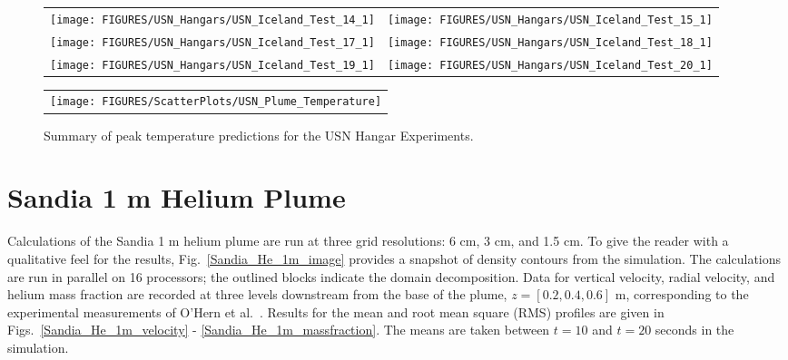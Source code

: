 \begin{figure}[p]
\begin{tabular*}{\textwidth}{l@{\extracolsep{\fill}}r}
\texttt{[image: FIGURES/USN\_Hangars/USN\_Iceland\_Test\_14\_1]} &
\texttt{[image: FIGURES/USN\_Hangars/USN\_Iceland\_Test\_15\_1]} \\
\texttt{[image: FIGURES/USN\_Hangars/USN\_Iceland\_Test\_17\_1]} &
\texttt{[image: FIGURES/USN\_Hangars/USN\_Iceland\_Test\_18\_1]} \\
\texttt{[image: FIGURES/USN\_Hangars/USN\_Iceland\_Test\_19\_1]} &
\texttt{[image: FIGURES/USN\_Hangars/USN\_Iceland\_Test\_20\_1]} \\
\end{tabular*}
\label{USN_Plume_Iceland_3}
\end{figure}

\begin{figure}[p]
\begin{center}
\begin{tabular}{l}
\texttt{[image: FIGURES/ScatterPlots/USN\_Plume\_Temperature]}
\end{tabular}
\caption{Summary of peak temperature predictions for the USN Hangar Experiments.}
\end{center}
\end{figure}

\clearpage

\section{Sandia 1 m Helium Plume}
\label{Sandia plume}

Calculations of the Sandia 1 m helium plume are run at three grid resolutions: 6 cm, 3 cm, and 1.5 cm.  To give the reader with a qualitative feel for the results, Fig.~\ref{Sandia_He_1m_image} provides a snapshot of density contours from the simulation. The calculations are run in parallel on 16 processors; the outlined blocks indicate the domain decomposition.  Data for vertical velocity, radial velocity, and helium mass fraction are recorded at three levels downstream from the base of the plume, $z = [0.2, 0.4, 0.6]$ m, corresponding to the experimental measurements of O'Hern et al.~\cite{OHern:2005}.  Results for the mean and root mean square (RMS) profiles are given in Figs.~\ref{Sandia_He_1m_velocity} - \ref{Sandia_He_1m_massfraction}.  The means are taken between $t=10$ and $t=20$ seconds in the simulation.

